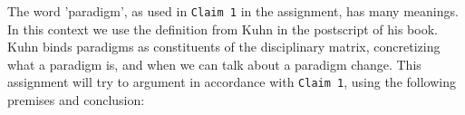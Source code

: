 The word 'paradigm', as used in \texttt{Claim 1} in the assignment\cite{assignment}, has many meanings. In this context we use the definition from Kuhn in the postscript of his book\cite{kuhn}. Kuhn binds paradigms as constituents of the disciplinary matrix, concretizing what a paradigm is, and when we can talk about a paradigm change. This assignment will try to argument in accordance with \texttt{Claim 1}, using the following premises and conclusion: